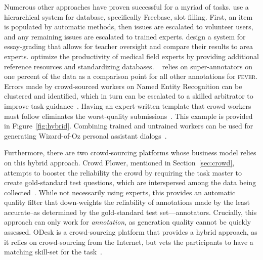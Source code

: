 Numerous other approaches have proven successful for a myriad of tasks.
%
\citet{kochhar2010anatomy} use a hierarchical system for database, specifically Freebase, slot filling.  First, an item is populated by automatic methods, then issues are escalated to volunteer users, and any remaining issues are escalated to trained experts. 
%
\citet{ade2012expert} design a system for essay-grading that allows for teacher oversight and compare their results to area experts.  
%
\citet{hong2018standardizing} optimize the productivity of medical field experts by providing additional reference resources and standardizing databases.  
%
~\citep{thorne2018fever} relies on super-annotators on one percent of the data as a comparison point for all other annotations for \textsc{fever}.
%
Errors made by crowd-sourced workers on Named Entity Recognition can be clustered and identified, which in turn can be escalated to a skilled arbitrator to improve task guidance~\citep{nguyen2019explainable}.
%
Having an expert-written template that crowd workers must follow eliminates the worst-quality submissions~\citep{budzianowski2018multiwoz}.  This example is provided in Figure~\ref{fig:hybrid}.
%
Combining trained and untrained workers can be used for generating Wizard-of-Oz personal assistant dialogs~\citep{byrne2019taskmaster}.


Furthermore, there are two crowd-sourcing platforms whose business model relies on this hybrid approach.  
%
Crowd Flower, mentioned in Section~\ref{sec:crowd}, attempts to booster the reliability the crowd by requiring the task master to create gold-standard test questions, which are interspersed among the data being collected~\citep{vakharia2015beyond}. 
%
While not necessarily using experts, this provides an automatic quality filter that down-weights the reliability of annotations made by the least accurate--as determined by the gold-standard test set---annotators.  
%
Crucially, this approach can only work for \textit{annotation}, as generation quality cannot be quickly assessed.
%
ODesk is a crowd-sourcing platform that provides a hybrid approach, as it relies on crowd-sourcing from the Internet, but vets the participants to have a matching skill-set for the task~\citep{vakharia2015beyond}.

\begin{comment}
removed since about chapter
In our work, we pair crowd-sourced workers from Mechanical Turk with actual customer service agents employed by a corporation.
%
This set-up is meant to imitate a real customer-service interaction. 
%
Customers are impatient and have no incentive to be grammatical, creative, or polite.
%
In contrast, customer service agents are beholden to their employers and must handle a plethora of unique customer requests.  
%
Having an expert in the conversation allows us to introduce creativity into the conversation, and to have a reliable source of conversation quality.  
\end{comment}



